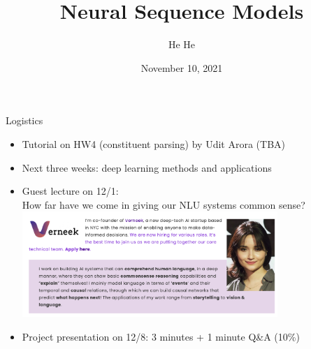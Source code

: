 \documentclass[usenames,dvipsnames,11pt,aspectratio=169]{beamer}
\title[CSCI-GA.2590]{Neural Sequence Models}
\author[He He]{He He
}
\institute[NYU]{New York University}
\date{November 10, 2021}
\begin{document}
\begin{frame}
\titlepage
\end{frame}

\begin{frame}
    {Logistics}
    \begin{itemize}
        \item Tutorial on HW4 (constituent parsing) by Udit Arora (TBA)
        \item Next three weeks: deep learning methods and applications 
        \item Guest lecture on 12/1:\\
            How far have we come in giving our NLU systems common sense? \\
            \includegraphics[height=4cm]{figures/nasrin}
        \item Project presentation on 12/8: 3 minutes + 1 minute Q\&A (10\%)
    \end{itemize}
\end{frame}
\end{document}
